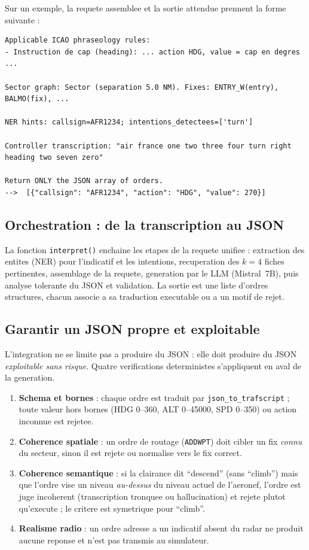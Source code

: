 \documentclass[11pt,a4paper]{article}
\begin{document}
Sur un exemple, la requete assemblee et la sortie attendue prennent la forme
suivante :

\begin{lstlisting}[caption={Requete unifiee assemblee (abregee) et JSON produit par le LLM.}]
Applicable ICAO phraseology rules:
- Instruction de cap (heading): ... action HDG, value = cap en degres ...

Sector graph: Sector (separation 5.0 NM). Fixes: ENTRY_W(entry), BALMO(fix), ...

NER hints: callsign=AFR1234; intentions_detectees=['turn']

Controller transcription: "air france one two three four turn right heading two seven zero"

Return ONLY the JSON array of orders.
-->  [{"callsign": "AFR1234", "action": "HDG", "value": 270}]
\end{lstlisting}

\subsection{Orchestration : de la transcription au JSON}

La fonction \texttt{interpret()} enchaine les etapes de la requete unifiee :
extraction des entites (NER) pour l'indicatif et les intentions, recuperation des
$k = 4$ fiches pertinentes, assemblage de la requete, generation par le LLM
(Mistral~7B), puis analyse tolerante du JSON et validation. La sortie est une liste
d'ordres structures, chacun associe a sa traduction executable ou a un motif de rejet.

\subsection{Garantir un JSON propre et exploitable}

L'integration ne se limite pas a produire du JSON : elle doit produire du JSON
\emph{exploitable sans risque}. Quatre verifications deterministes s'appliquent en
aval de la generation.

\begin{enumerate}[label=\textbf{\arabic*.}, leftmargin=2.0em]
  \item \textbf{Schema et bornes} : chaque ordre est traduit par
  \texttt{json\_to\_trafscript} ; toute valeur hors bornes (HDG 0--360, ALT
  0--45000, SPD 0--350) ou action inconnue est rejetee.
  \item \textbf{Coherence spatiale} : un ordre de routage (\texttt{ADDWPT}) doit
  cibler un fix \emph{connu} du secteur, sinon il est rejete ou normalise vers le fix
  correct.
  \item \textbf{Coherence semantique} : si la clairance dit ``descend'' (sans
  ``climb'') mais que l'ordre vise un niveau \emph{au-dessus} du niveau actuel de
  l'aeronef, l'ordre est juge incoherent (transcription tronquee ou hallucination) et
  rejete plutot qu'execute ; le critere est symetrique pour ``climb''.
  \item \textbf{Realisme radio} : un ordre adresse a un indicatif absent du radar ne
  produit aucune reponse et n'est pas transmis au simulateur.
\end{enumerate}
\end{document}
